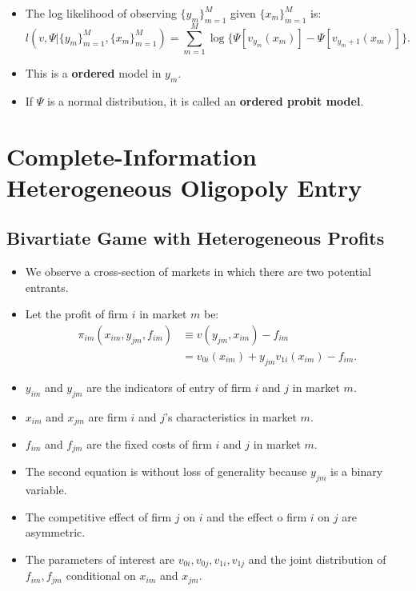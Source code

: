 \documentclass[]{book}
\providecommand{\tightlist}{%
  \setlength{\itemsep}{0pt}\setlength{\parskip}{0pt}}
\begin{document}
\begin{itemize}
\tightlist
\item
  The log likelihood of observing \(\{y_m\}_{m = 1}^M\) given
  \(\{x_m\}_{m = 1}^M\) is: \[
  l(v, \Psi|\{y_m\}_{m = 1}^M,  \{x_m\}_{m = 1}^M) = \sum_{m = 1}^M \log\{\Psi[v_{y_m}(x_m)] - \Psi[v_{y_m + 1}(x_m)]\}.
  \]
\item
  This is a \textbf{ordered} model in \(y_m\).
\item
  If \(\Psi\) is a normal distribution, it is called an \textbf{ordered
  probit model}.
\end{itemize}

\section{Complete-Information Heterogeneous Oligopoly
Entry}\label{complete-information-heterogeneous-oligopoly-entry}

\subsection{Bivartiate Game with Heterogeneous
Profits}\label{bivartiate-game-with-heterogeneous-profits}

\begin{itemize}
\tightlist
\item
  We observe a cross-section of markets in which there are two potential
  entrants.
\item
  Let the profit of firm \(i\) in market \(m\) be: \[
  \begin{split}
  \pi_{im}(x_{im}, y_{jm}, f_{im}) & \equiv v(y_{jm}, x_{im}) - f_{im}\\
  &=v_{0i}(x_{im}) + y_{jm} v_{1i}(x_{im}) - f_{im}.
  \end{split}
  \]
\item
  \(y_{im}\) and \(y_{jm}\) are the indicators of entry of firm \(i\)
  and \(j\) in market \(m\).
\item
  \(x_{im}\) and \(x_{jm}\) are firm \(i\) and \(j\)'s characteristics
  in market \(m\).
\item
  \(f_{im}\) and \(f_{jm}\) are the fixed costs of firm \(i\) and \(j\)
  in market \(m\).
\item
  The second equation is without loss of generality because \(y_{jm}\)
  is a binary variable.
\item
  The competitive effect of firm \(j\) on \(i\) and the effect o firm
  \(i\) on \(j\) are asymmetric.
\item
  The parameters of interest are \(v_{0i}, v_{0j}, v_{1i}, v_{1j}\) and
  the joint distribution of \(f_{im}, f_{jm}\) conditional on \(x_{im}\)
  and \(x_{jm}\).
\end{itemize}
\end{document}
